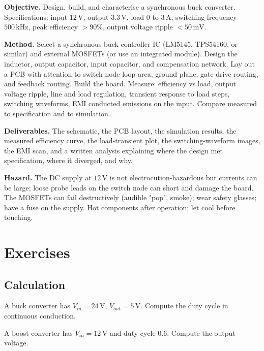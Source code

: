 \begin{project}
\textbf{Objective.} Design, build, and characterise a synchronous buck converter. Specifications: input $12\,\text{V}$, output $3.3\,\text{V}$, load $0$ to $3\,\text{A}$, switching frequency $500\,\text{kHz}$, peak efficiency $> 90\%$, output voltage ripple $< 50\,\text{mV}$.

\textbf{Method.} Select a synchronous buck controller IC (LM5145, TPS54160, or similar) and external MOSFETs (or use an integrated module). Design the inductor, output capacitor, input capacitor, and compensation network. Lay out a PCB with attention to switch-node loop area, ground plane, gate-drive routing, and feedback routing. Build the board. Measure: efficiency vs load, output voltage ripple, line and load regulation, transient response to load steps, switching waveforms, EMI conducted emissions on the input. Compare measured to specification and to simulation.

\textbf{Deliverables.} The schematic, the PCB layout, the simulation results, the measured efficiency curve, the load-transient plot, the switching-waveform images, the EMI scan, and a written analysis explaining where the design met specification, where it diverged, and why.

\textbf{Hazard.} The DC supply at $12\,\text{V}$ is not electrocution-hazardous but currents can be large; loose probe leads on the switch node can short and damage the board. The MOSFETs can fail destructively (audible "pop", smoke); wear safety glasses; have a fuse on the supply. Hot components after operation; let cool before touching.
\end{project}

\section{Exercises}

\subsection*{Calculation}

\begin{exercise}
A buck converter has $V_{in} = 24\,\text{V}$, $V_{out} = 5\,\text{V}$. Compute the duty cycle in continuous conduction.
\end{exercise}

\begin{exercise}
A boost converter has $V_{in} = 12\,\text{V}$ and duty cycle $0.6$. Compute the output voltage.
\end{exercise}

